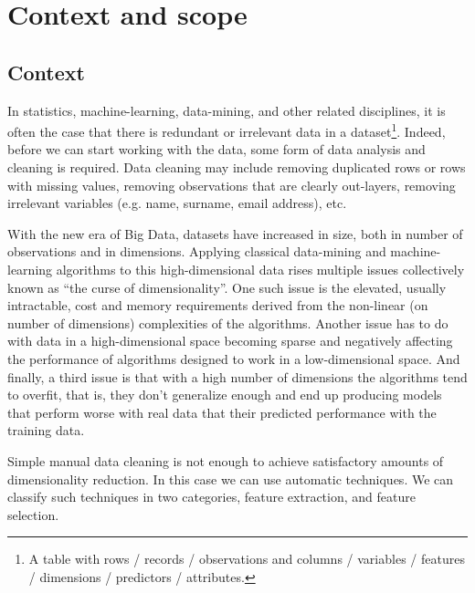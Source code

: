 
\chapter{Context and scope} %

\label{Chapter1} %


\section{Context}

In statistics, machine-learning, data-mining, and other related disciplines, it is often the case that there is redundant or irrelevant data in a dataset\footnote{A table with rows / records / observations and columns / variables / features / dimensions / predictors / attributes.}. Indeed, before we can start working with the data, some form of data analysis and cleaning is required. Data cleaning may include removing duplicated rows or rows with missing values, removing observations that are clearly out-layers, removing irrelevant variables (e.g. name, surname, email address), etc.

With the new era of Big Data, datasets have increased in size, both in number of observations and in dimensions. Applying classical data-mining and machine-learning algorithms to this high-dimensional data rises multiple issues collectively known as “the curse of dimensionality”. One such issue is the elevated, usually intractable, cost and memory requirements derived from the non-linear (on number of dimensions) complexities of the algorithms. Another issue has to do with data in a high-dimensional space becoming sparse and negatively affecting the performance of algorithms designed to work in a low-dimensional space. And finally, a third issue is that with a high number of dimensions the algorithms tend to overfit, that is, they don't generalize enough and end up producing models that perform worse with real data that their predicted performance with the training data. 

Simple manual data cleaning is not enough to achieve satisfactory amounts of dimensionality reduction. In this case we can use automatic techniques. We can classify such techniques in two categories, feature extraction, and feature selection.

